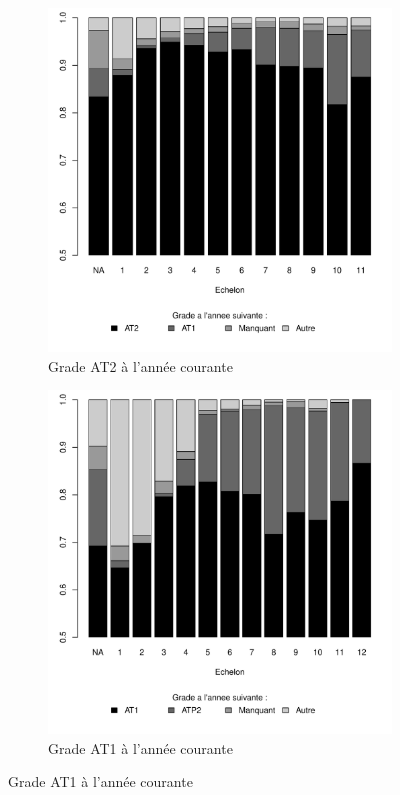\documentclass[11pt,a4paper]{article}
\begin{document}
\begin{figure}[ht] 
  \caption{Situation d'une année à l'autre, selon l'échelon}
  \label{echelon_by_neg} 
  \begin{subfigure}[b]{0.75\linewidth}
      \caption{Grade AT2 à l'année courante}
      \vspace{-0.5cm} 
    \label{echelon_by_neg_0} 
    \centering
    \includegraphics[width=1\linewidth]{next_AT2.pdf} 
  \end{subfigure}
  \begin{subfigure}[b]{0.75\linewidth}
        \caption{Grade AT1 à l'année courante} 
              \vspace{-0.5cm} 
    \label{echelon_by_neg_1} 
    \centering
    \includegraphics[width=1\linewidth]{next_AT1.pdf} 

\end{subfigure}
\end{figure}
\end{document}
